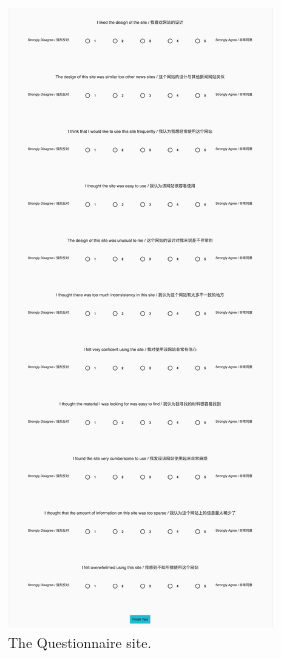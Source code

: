 \begin{figure}[h]
	\centering
	\includegraphics[width=70mm]{Images/sus.png}
	\decoRule
	\caption[Questionnaire]{The Questionnaire site.}
	\label{fig:sus_site}
\end{figure}



